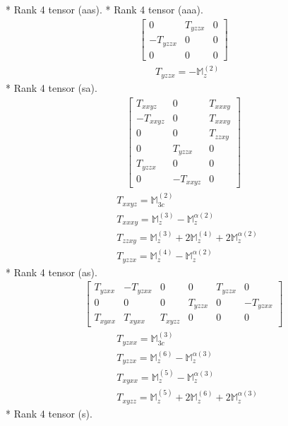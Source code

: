 \documentclass[fleqn,8pt,landscape]{jsarticle}
\begin{document}
* Rank 4 tensor (aas).
* Rank 4 tensor (aaa).
\begin{align*}
\begin{bmatrix} 0 & T_{yzzx} & 0 \\ - T_{yzzx} & 0 & 0 \\ 0 & 0 & 0 \end{bmatrix}
\end{align*}
\begin{align*}
& T_{yzzx} = - \mathbb{M}_{z}^{(2)}
\end{align*}
* Rank 4 tensor (sa).
\begin{align*}
\begin{bmatrix} T_{xxyz} & 0 & T_{xxxy} \\ - T_{xxyz} & 0 & T_{xxxy} \\ 0 & 0 & T_{zzxy} \\ 0 & T_{yzzx} & 0 \\ T_{yzzx} & 0 & 0 \\ 0 & - T_{xxyz} & 0 \end{bmatrix}
\end{align*}
\begin{align*}
& T_{xxyz} = \mathbb{M}_{3c}^{(2)} \\
& T_{xxxy} = \mathbb{M}_{z}^{(3)} - \mathbb{M}_{z}^{\alpha(2)} \\
& T_{zzxy} = \mathbb{M}_{z}^{(3)} + 2 \mathbb{M}_{z}^{(4)} + 2 \mathbb{M}_{z}^{\alpha(2)} \\
& T_{yzzx} = \mathbb{M}_{z}^{(4)} - \mathbb{M}_{z}^{\alpha(2)}
\end{align*}
* Rank 4 tensor (as).
\begin{align*}
\begin{bmatrix} T_{yzxx} & - T_{yzxx} & 0 & 0 & T_{yzzx} & 0 \\ 0 & 0 & 0 & T_{yzzx} & 0 & - T_{yzxx} \\ T_{xyxx} & T_{xyxx} & T_{xyzz} & 0 & 0 & 0 \end{bmatrix}
\end{align*}
\begin{align*}
& T_{yzxx} = \mathbb{M}_{3c}^{(3)} \\
& T_{yzzx} = \mathbb{M}_{z}^{(6)} - \mathbb{M}_{z}^{\alpha(3)} \\
& T_{xyxx} = \mathbb{M}_{z}^{(5)} - \mathbb{M}_{z}^{\alpha(3)} \\
& T_{xyzz} = \mathbb{M}_{z}^{(5)} + 2 \mathbb{M}_{z}^{(6)} + 2 \mathbb{M}_{z}^{\alpha(3)}
\end{align*}
* Rank 4 tensor (s).
\end{document}
